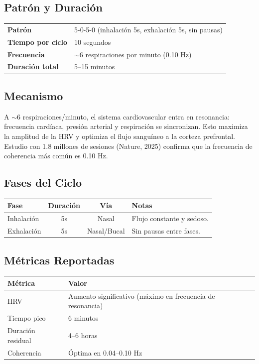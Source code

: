 \documentclass[12pt,a4paper]{article}
\begin{document}
\subsection*{Patrón y Duración}
\begin{tabularx}{\textwidth}{lX}
    \textbf{Patrón} & 5-0-5-0 (inhalación 5s, exhalación 5s, sin pausas) \\
    \textbf{Tiempo por ciclo} & 10 segundos \\
    \textbf{Frecuencia} & $\sim$6 respiraciones por minuto (0.10 Hz) \\
    \textbf{Duración total} & 5--15 minutos \\
\end{tabularx}

\subsection*{Mecanismo}
A $\sim$6 respiraciones/minuto, el sistema cardiovascular entra en resonancia:
frecuencia cardíaca, presión arterial y respiración se sincronizan. Esto maximiza
la amplitud de la HRV y optimiza el flujo sanguíneo a la corteza prefrontal.
Estudio con 1.8 millones de sesiones (Nature, 2025) confirma que la frecuencia
de coherencia más común es 0.10 Hz.

\subsection*{Fases del Ciclo}
\begin{tabularx}{\textwidth}{lccX}
    \toprule
    \textbf{Fase} & \textbf{Duración} & \textbf{Vía} & \textbf{Notas} \\
    \midrule
    Inhalación & 5s & Nasal & Flujo constante y sedoso. \\
    Exhalación & 5s & Nasal/Bucal & Sin pausas entre fases. \\
    \bottomrule
\end{tabularx}

\subsection*{Métricas Reportadas}
\begin{tabularx}{\textwidth}{lX}
    \toprule
    \textbf{Métrica} & \textbf{Valor} \\
    \midrule
    HRV & Aumento significativo (máximo en frecuencia de resonancia) \\
    Tiempo pico & 6 minutos \\
    Duración residual & 4--6 horas \\
    Coherencia & Óptima en 0.04--0.10 Hz \\
    \bottomrule
\end{tabularx}
\end{document}
